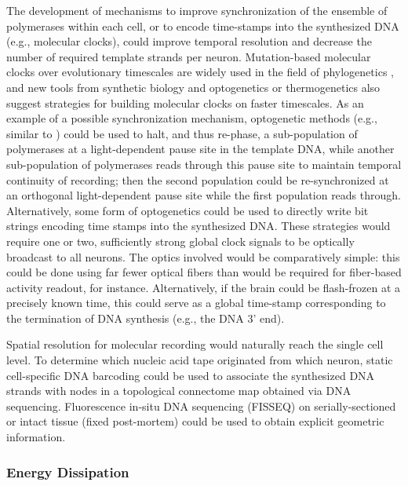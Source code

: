 The development of mechanisms to improve synchronization of the ensemble of polymerases within each cell, or to encode time-stamps into the synthesized DNA (e.g., molecular clocks), could improve temporal resolution and decrease the number of required template strands per neuron. Mutation-based molecular clocks over evolutionary timescales are widely used in the field of phylogenetics \cite{Ochman1987}, and new tools from synthetic biology \cite{Elowitz2000} and optogenetics or thermogenetics \cite{Bernstein2012} also suggest strategies for building molecular clocks on faster timescales. As an example of a possible synchronization mechanism, optogenetic methods (e.g., similar to \cite{konermann2013optical}) could be used to halt, and thus re-phase, a sub-population of polymerases at a light-dependent pause site in the template DNA, while another sub-population of polymerases reads through this pause site to maintain temporal continuity of recording; then the second population could be re-synchronized at an orthogonal light-dependent pause site while the first population reads through. Alternatively, some form of optogenetics could be used to directly write bit strings encoding time stamps into the synthesized DNA.  These strategies would require one or two, sufficiently strong global clock signals to be optically broadcast to all neurons. The optics involved would be comparatively simple: this could be done using far fewer optical fibers than would be required for fiber-based activity readout, for instance. Alternatively, if the brain could be flash-frozen at a precisely known time, this could serve as a global time-stamp corresponding to the termination of DNA synthesis (e.g., the DNA 3' end).

Spatial resolution for molecular recording would naturally reach the single cell level. To determine which nucleic acid tape originated from which neuron, static cell-specific DNA barcoding could be used \cite{zador12} to associate the synthesized DNA strands with nodes in a topological connectome map obtained via DNA sequencing.  Fluorescence in-situ DNA sequencing (FISSEQ) \cite{Lee2013InSitu} on serially-sectioned or intact tissue (fixed post-mortem) \cite{chung2013structural} could be used to obtain explicit geometric information.

\subsubsection{Energy Dissipation}

